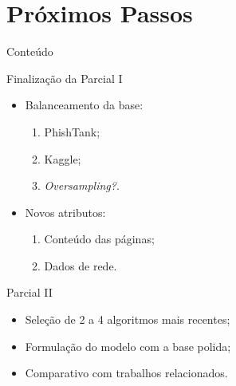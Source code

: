 \documentclass{beamer}
\begin{document}
\section{Próximos Passos}

\begin{frame}{Conteúdo} 
     \tableofcontents[currentsection]
\end{frame}

\begin{frame}{Finalização da Parcial I}

    \begin{itemize}
        \setlength{\itemsep}{10pt}
        \item Balanceamento da base:
        \begin{enumerate}
            \item PhishTank;
            \item Kaggle;
            \item \emph{Oversampling?}.
        \end{enumerate}
        \item Novos atributos:
        \begin{enumerate}
            \item Conteúdo das páginas;
            \item Dados de rede.
        \end{enumerate}
    \end{itemize}

\end{frame}

\begin{frame}{Parcial II}

    \begin{itemize}
        \setlength{\itemsep}{10pt}
        \item Seleção de 2 a 4 algoritmos mais recentes;
        \item Formulação do modelo com a base polida;
        \item Comparativo com trabalhos relacionados.
    \end{itemize}

\end{frame}

%     
\end{document}
